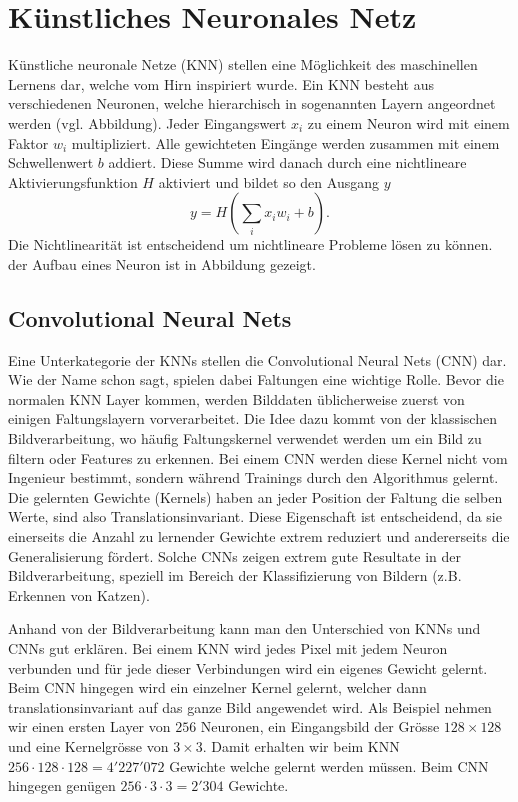 \section{Künstliches Neuronales Netz}

Künstliche neuronale Netze (KNN) stellen eine Möglichkeit des maschinellen Lernens dar, welche vom Hirn inspiriert wurde.
Ein KNN besteht aus verschiedenen Neuronen, welche hierarchisch in sogenannten Layern angeordnet werden (vgl. Abbildung). %
Jeder Eingangswert $x_i$ zu einem Neuron wird mit einem Faktor $w_i$ multipliziert.
Alle gewichteten Eingänge werden zusammen mit einem Schwellenwert $b$ addiert.
Diese Summe wird danach durch eine nichtlineare Aktivierungsfunktion $H$ aktiviert und bildet so den Ausgang $y$
\begin{equation}
y=H\left(\sum_{i} x_i w_i+b\right).
\end{equation}
Die Nichtlinearität ist entscheidend um nichtlineare Probleme lösen zu können.
der Aufbau eines Neuron ist in Abbildung gezeigt. %

\subsection{Convolutional Neural Nets}

Eine Unterkategorie der KNNs stellen die Convolutional Neural Nets (CNN) dar.
Wie der Name schon sagt, spielen dabei Faltungen eine wichtige Rolle.
Bevor die normalen KNN Layer kommen, werden Bilddaten üblicherweise zuerst von einigen Faltungslayern vorverarbeitet.
Die Idee dazu kommt von der klassischen Bildverarbeitung, wo häufig Faltungskernel verwendet werden um ein Bild zu filtern oder Features zu erkennen.
Bei einem CNN werden diese Kernel nicht vom Ingenieur bestimmt, sondern während Trainings durch den Algorithmus gelernt.  %
Die gelernten Gewichte (Kernels) haben an jeder Position der Faltung die selben Werte, sind also Translationsinvariant.
Diese Eigenschaft ist entscheidend, da sie einerseits die Anzahl zu lernender Gewichte extrem reduziert und andererseits die Generalisierung fördert.
Solche CNNs zeigen extrem gute Resultate in der Bildverarbeitung, speziell im Bereich der Klassifizierung von Bildern (z.B. Erkennen von Katzen).

Anhand von der Bildverarbeitung kann man den Unterschied von KNNs und CNNs gut erklären.
Bei einem KNN wird jedes Pixel mit jedem Neuron verbunden und für jede dieser Verbindungen wird ein eigenes Gewicht gelernt.
Beim CNN hingegen wird ein einzelner Kernel gelernt, welcher dann translationsinvariant auf das ganze Bild angewendet wird.
Als Beispiel nehmen wir einen ersten Layer von $256$ Neuronen, ein Eingangsbild der Grösse $128\times128$ und eine Kernelgrösse von $3\times3$.
Damit erhalten wir beim KNN	$256 \cdot 128 \cdot 128 = 4'227'072$ Gewichte welche gelernt werden müssen.
Beim CNN hingegen genügen $256 \cdot 3 \cdot 3 = 2'304$ Gewichte.

